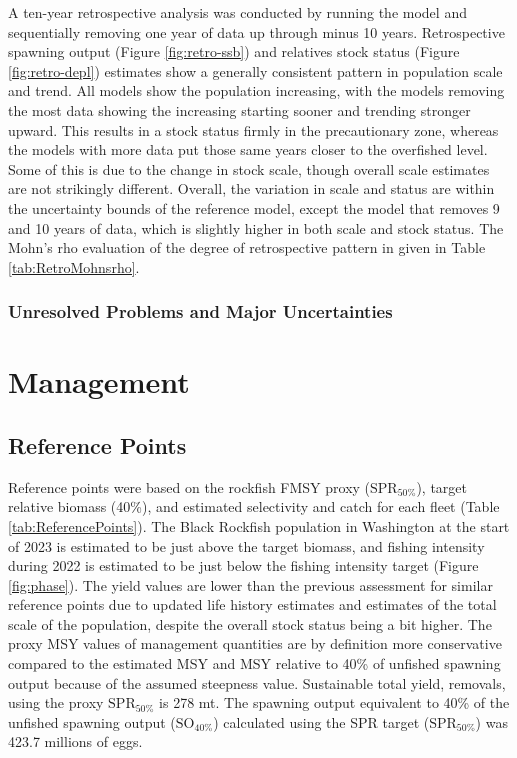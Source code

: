 \documentclass[11pt,
  english,
  letterpaper,
]{article}
\begin{document}
A ten-year retrospective analysis was conducted by running the model and sequentially removing one year of data up through minus 10 years. Retrospective spawning output (Figure \ref{fig:retro-ssb}) and relatives stock status (Figure \ref{fig:retro-depl}) estimates show a generally consistent pattern in population scale and trend. All models show the population increasing, with the models removing the most data showing the increasing starting sooner and trending stronger upward. This results in a stock status firmly in the precautionary zone, whereas the models with more data put those same years closer to the overfished level. Some of this is due to the change in stock scale, though overall scale estimates are not strikingly different. Overall, the variation in scale and status are within the uncertainty bounds of the reference model, except the model that removes 9 and 10 years of data, which is slightly higher in both scale and stock status. The Mohn's rho evaluation of the degree of retrospective pattern in given in Table \ref{tab:RetroMohnsrho}.

\hypertarget{unresolved-problems-and-major-uncertainties-1}{%
\subsubsection{Unresolved Problems and Major Uncertainties}\label{unresolved-problems-and-major-uncertainties-1}}

\hypertarget{management}{%
\section{Management}\label{management}}

\hypertarget{reference-points-1}{%
\subsection{Reference Points}\label{reference-points-1}}

Reference points were based on the rockfish FMSY proxy (\(\text{SPR}_{50\%}\)), target relative biomass (40\%), and estimated selectivity and catch for each fleet (Table \ref{tab:ReferencePoints}). The Black Rockfish population in Washington at the start of 2023 is estimated to be just above the target biomass, and fishing intensity during 2022 is estimated to be just below the fishing intensity target (Figure \ref{fig:phase}). The yield values are lower than the previous assessment for similar reference points due to updated life history estimates and estimates of the total scale of the population, despite the overall stock status being a bit higher. The proxy MSY values of management quantities are by definition more conservative compared to the estimated MSY and MSY relative to 40\% of unfished spawning output because of the assumed steepness value. Sustainable total yield, removals, using the proxy \(\text{SPR}_{50\%}\) is 278 mt. The spawning output equivalent to 40\% of the unfished spawning output (\(\text{SO}_{40\%}\)) calculated using the SPR target (\(\text{SPR}_{50\%}\)) was 423.7 millions of eggs.
\end{document}
